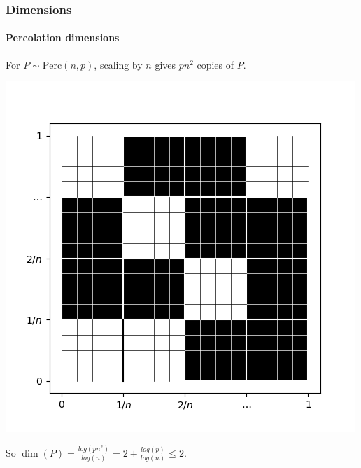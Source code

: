 \documentclass{beamer}
\newcommand{\perc}[2]{\text{Perc}\left( #1, #2 \right)}
\begin{document}
	\begin{frame}
		\frametitle{Dimensions}
		\framesubtitle{Percolation dimensions}
		For $P \sim \perc{n}{p}$, scaling by $n$ gives $pn^2$ copies of $P$.
		\begin{center}
			\includegraphics[scale=0.4]{imgs/perc_fig3.png}
		\end{center}
		So $\dim(P) = \frac{log(pn^2)}{log(n)} = 2 + \frac{log(p)}{log(n)} \leq 2$.
		
	\end{frame}
	
\end{document}
